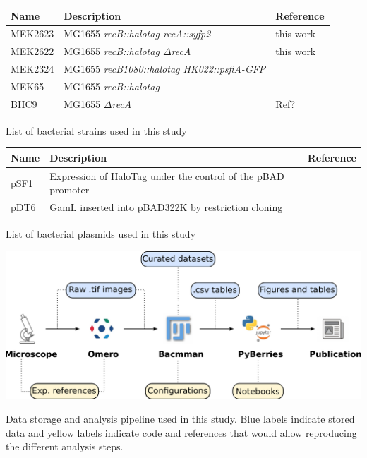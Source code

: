 \begin{supptable}[htbp]
    \centering
    \begin{tabular}{lll}
        \toprule
        Name & Description & Reference\\
        \midrule
        MEK2623 & MG1655 \textit{recB::halotag recA::syfp2} & this work\\
        MEK2622 & MG1655 \textit{recB::halotag $\Delta$recA} & this work \\ %
        MEK2324 & MG1655 \textit{recB1080::halotag HK022::psfiA-GFP} &  \\ %
        MEK65 & MG1655 \textit{recB::halotag} & \cite{Lepore2019a} \\
        BHC9 & MG1655 \textit{$\Delta$recA} & Ref? \\
        \bottomrule
    \end{tabular}
    \caption{List of bacterial strains used in this study}
    \label{SItab:strains}
\end{supptable}

\begin{supptable}[htbp]
    \centering
    \begin{tabular}{lll}
        \toprule
        Name & Description & Reference\\
        \midrule
        pSF1 & Expression of HaloTag under the control of the pBAD promoter & \cite{Lepore2019a} \\
        pDT6 & GamL inserted into pBAD322K by restriction cloning & \cite{Wilkinson2016} \\
        \bottomrule
    \end{tabular}
    \caption{List of bacterial plasmids used in this study}
    \label{SItab:plasmids}
\end{supptable}

\begin{suppfigure*}[htbp]
\begin{center}
\includegraphics[width=\textwidth]{SI_Figures/Data_analysis_workflow.pdf}
\end{center}
\caption{Data storage and analysis pipeline used in this study. Blue labels indicate stored data and yellow labels indicate code and references that would allow reproducing the different analysis steps.}
\label{SIFig:analysis_workflow}
\end{suppfigure*}

